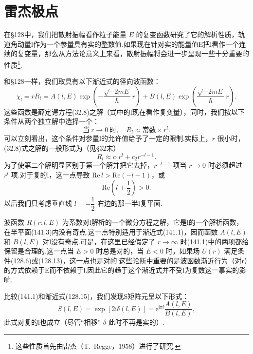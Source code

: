 \section{雷杰极点}

在§128中，我们把散射振幅看作粒子能量 $E$ 的复变函数研究了它的解析性质，轨道角动量l作为一个参量具有实的整数值.如果现在针对实的能量值E把l看作一个连续的复变量，那么从方法论意义上来看，散射振幅将会进一步呈现一些十分重要的性质\footnote{这些性质首先由雷杰（T.~Regge，1958）进行了研究.}.

和§128一样，我们取具有以下渐近式的径向波函数：
\begin{equation}
  \chi_l=rR_l=A(l,E)
  \exp\left(-\frac{\sqrt{-2mE}}{\hbar}\,r\right)
  +B(l,E)\exp\left(\frac{\sqrt{-2mE}}{\hbar}\,r\right).
\end{equation}
这些函数是薛定谔方程(32.8)之解（式中的l现在看作复变量），同时，我们按以下条件从两个独立解中选择一个：
\begin{equation}
  \text{当}\ r\to0\ \text{时},\quad R_l\approx\text{常数}\times r^{l}.
\end{equation}
可以立刻看出，这个条件对参量l的允许值给予了一定的限制.实际上，$r$ 很小时，(32.8)式之解的一般形式为（见§32末）
\begin{equation*}
  R_l\approx c_1r^l+c_2r^{-l-1}.
\end{equation*}
为了使第二个解明显区别于第一个解并把它去掉，$r^{-l-1}$ 项当 $r\to0$ 时必须超过 $r^l$ 项.对于复的l，这一点导致 $\mathrm{Re}\,l>\mathrm{Re}(-l-1)$，或
\begin{equation}
  \mathrm{Re}\left(l+\frac{1}{2}\right)>0.
\end{equation}
以后我们只考虑垂直线 $l=-\dfrac{1}{2}$ 右边的那一半l复平面.

波函数 $R(r;l,E)$ 为系数对l解析的一个微分方程之解，它是l的一个解析函数，在半平面(141.3)内没有奇点.这一点特别适用于渐近式(141.1)，因而函数 $A(l,E)$ 和 $B(l,E)$ 对l没有奇点.可是，在这里已经假定了 $r\to\infty$ 时(141.1)中的两项都给保留是合理的.这一点当 $E>0$ 时总是对的，当 $E<0$ 时，如果场 $U(r)$ 满足条件(128.6)或(128.13)，这一点也是对的.这些论断中重要的是波函数渐近行为（对r）的方式依赖于E而不依赖于l.因此它的趋于这个渐近式并不受l为复数这一事实的影响.

比较(141.1)和渐近式(128.15)，我们发现S矩阵元呈以下形式：
\begin{equation}
  S(l,E)=\exp\left[2\mathrm{i}\delta(l,E)\right]
  =\mathrm{e}^{\mathrm{i}\pi l}\frac{A(l,E)}{B(l,E)},
\end{equation}
此式对复的l也成立（尽管“相移” $\delta$ 此时不再是实的）.

